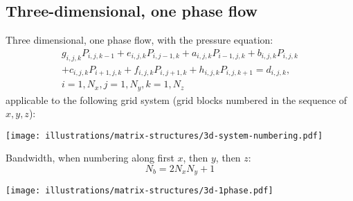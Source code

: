 \subsection{Three-dimensional, one phase flow} %
\label{sub:three_dimensional_one_phase_flow}

\begin{question}
  Three dimensional, one phase flow, with the pressure equation:
  \begin{multline*}
    g_{i,j,k}P_{i,j,k-1}+e_{i,j,k}P_{i,j-1,k}+a_{i,j,k}P_{i-1,j,k}+b_{i,j,k}P_{i,j,k} \\
    +c_{i,j,k}P_{i+1,j,k}+f_{i,j,k}P_{i,j+1,k}+h_{i,j,k}P_{i,j,k+1}=d_{i,j,k}, \\
    i=1,N_{x},j=1,N_{y},k=1,N_{z}
  \end{multline*}
  applicable to the following grid system (grid blocks numbered in the sequence of $x,y,z$):

  \begin{center}
    \texttt{[image: illustrations/matrix-structures/3d-system-numbering.pdf]}
  \end{center}
\end{question}

Bandwidth, when numbering along first $x$, then  $y$, then $z$:
\begin{equation}
  N_b = 2N_x N_y +1 \nonumber
\end{equation}

\begin{center}
  \texttt{[image: illustrations/matrix-structures/3d-1phase.pdf]}
\end{center}


